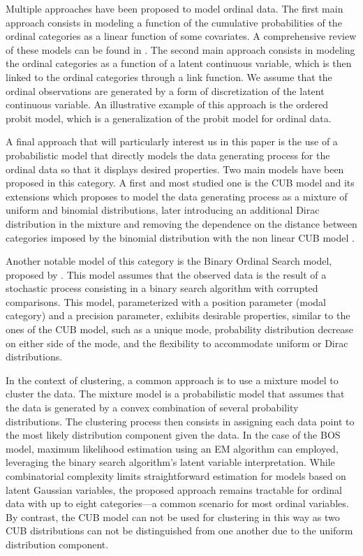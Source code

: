 Multiple approaches have been proposed to model ordinal data. The first main approach consists in modeling a function of the cumulative probabilities of the ordinal categories as a linear function of some covariates. A comprehensive review of these models can be found in \cite{agresti2010analysis}. The second main approach consists in modeling the ordinal categories as a function of a latent continuous variable, which is then linked to the ordinal categories through a link function. We assume that the ordinal observations are generated by a form of discretization of the latent continuous variable. An illustrative example of this approach is the ordered probit model, which is a generalization of the probit model for ordinal data.

A final approach that will particularly interest us in this paper is the use of a probabilistic model that directly models the data generating process for the ordinal data so that it displays desired properties. Two main models have been proposed in this category. A first and most studied one is the CUB model and its extensions \citep{d2005mixture} which proposes to model the data generating process as a mixture of uniform and binomial distributions, later introducing an additional Dirac distribution in the mixture and removing the dependence on the distance between categories imposed by the binomial distribution with the non linear CUB model \citep{manisera2014modeling}.

Another notable model of this category is the Binary Ordinal Search model, proposed by \cite{biernacki2016model}. This model assumes that the observed data is the result of a stochastic process consisting in a binary search algorithm with corrupted comparisons. This model, parameterized with a position parameter (modal category) and a precision parameter, exhibits desirable properties, similar to the ones of the CUB model, such as a unique mode, probability distribution decrease on either side of the mode, and the flexibility to accommodate uniform or Dirac distributions. 

In the context of clustering, a common approach is to use a mixture model to cluster the data. The mixture model is a probabilistic model that assumes that the data is generated by a convex combination of several probability distributions. The clustering process then consists in assigning each data point to the most likely distribution component given the data. In the case of the BOS model, maximum likelihood estimation using an EM algorithm can employed, leveraging the binary search algorithm's latent variable interpretation. While combinatorial complexity limits straightforward estimation for models based on latent Gaussian variables, the proposed approach remains tractable for ordinal data with up to eight categories—a common scenario for most ordinal variables. By contrast, the CUB model can not be used for clustering in this way as two CUB distributions can not be distinguished from one another due to the uniform distribution component.



